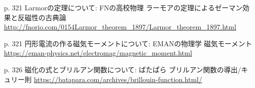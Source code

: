 \documentclass[]{jsarticle}
\begin{document}
p. 321 Larmorの定理について: FNの高校物理 ラーモアの定理によるゼーマン効果と反磁性の古典論 \url{http://fnorio.com/0154Larmor_theorem_1897/Larmor_theorem_1897.html}

p. 321 円形電流の作る磁気モーメントについて: EMANの物理学 磁気モーメント\url{https://eman-physics.net/electromag/magnetic_moment.html}

p. 326 磁化の式とブリルアン関数について: ばたぱら ブリルアン関数の導出/キュリー則 \url{https://batapara.com/archives/brillouin-function.html/}
\end{document}
